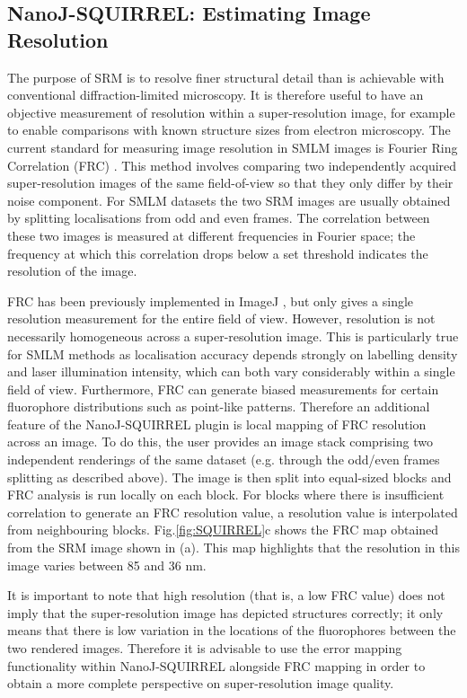 \subsection*{NanoJ-SQUIRREL: Estimating Image Resolution}
The purpose of SRM is to resolve finer structural detail than is achievable with conventional diffraction-limited microscopy. It is therefore useful to have an objective measurement of resolution within a super-resolution image, for example to enable comparisons with known structure sizes from electron microscopy. The current standard for measuring image resolution in SMLM images is Fourier Ring Correlation (FRC) \cite{nieuwenhuizen2013measuring}. This method involves comparing two independently acquired super-resolution images of the same field-of-view so that they only differ by their noise component. For SMLM datasets the two SRM images are usually obtained by splitting localisations from odd and even frames. The correlation between these two images is measured at different frequencies in Fourier space; the frequency at which this correlation drops below a set threshold indicates the resolution of the image.

 FRC has been previously implemented in ImageJ \cite{nieuwenhuizen2013measuring}, but only gives a single resolution measurement for the entire field of view. However, resolution is not necessarily homogeneous across a super-resolution image. This is particularly true for SMLM methods as localisation accuracy depends strongly on labelling density and laser illumination intensity, which can both vary considerably within a single field of view. Furthermore, FRC can generate biased measurements for certain fluorophore distributions such as point-like patterns. Therefore an additional feature of the NanoJ-SQUIRREL plugin is local mapping of FRC resolution across an image. To do this, the user provides an image stack comprising two independent renderings of the same dataset (e.g. through the odd/even frames splitting as described above). The image is then split into equal-sized blocks and FRC analysis is run locally on each block. For blocks where there is insufficient correlation to generate an FRC resolution value, a resolution value is interpolated from neighbouring blocks. Fig.\ref{fig:SQUIRREL}c shows the FRC map obtained from the SRM image shown in (a). This map highlights that the resolution in this image varies between 85 and 36 nm.

It is important to note that high resolution (that is, a low FRC value) does not imply that the super-resolution image has depicted structures correctly; it only means that there is low variation in the locations of the fluorophores between the two rendered images. Therefore it is advisable to use the error mapping functionality within NanoJ-SQUIRREL alongside FRC mapping in order to obtain a more complete perspective on super-resolution image quality.

